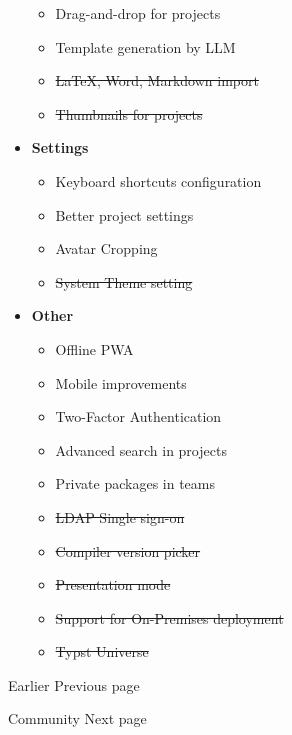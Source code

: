 \begin{itemize}
  \begin{itemize}
  \tightlist
  \item
    Drag-and-drop for projects
  \item
    Template generation by LLM
  \item
    \st{LaTeX, Word, Markdown import}
  \item
    \st{Thumbnails for projects}
  \end{itemize}
\item
  \textbf{Settings}

  \begin{itemize}
  \tightlist
  \item
    Keyboard shortcuts configuration
  \item
    Better project settings
  \item
    Avatar Cropping
  \item
    \st{System Theme setting}
  \end{itemize}
\item
  \textbf{Other}

  \begin{itemize}
  \tightlist
  \item
    Offline PWA
  \item
    Mobile improvements
  \item
    Two-Factor Authentication
  \item
    Advanced search in projects
  \item
    Private packages in teams
  \item
    \st{LDAP Single sign-on}
  \item
    \st{Compiler version picker}
  \item
    \st{Presentation mode}
  \item
    \st{Support for On-Premises deployment}
  \item
    \st{Typst Universe}
  \end{itemize}
\end{itemize}

\href{/docs/changelog/earlier/}{\pandocbounded{}}

{ Earlier } { Previous page }

\href{/docs/community/}{\pandocbounded{}}

{ Community } { Next page }
